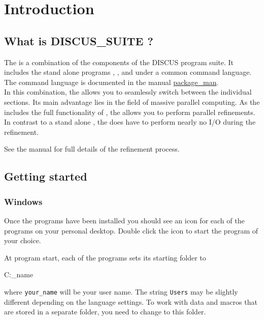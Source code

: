 
\chapter{Introduction \label{intro}}
\section{What is DISCUS\_SUITE ?}

The \Suite is a combination of the components of the DISCUS program 
suite. It includes the stand alone programs 
\href{./discus\_man.pdf}\discus, 
\href{./diffev\_man.pdf}\diffev, and
\href{./kuplot\_man.pdf}\Kuplot under a common  command language. 
The command language is documented in the manual 
\href{./package\_man.pdf}{package\_man}.\\
In this combination, the 
\Suite allows you to seamlessly switch between the individual
sections. Its main advantage lies in the field of massive parallel 
computing. As the \Suite includes the full functionality of 
\diffev, the \Suite allows you to perform parallel refinements.
In contrast to a stand alone \diffev, the \Suite does have to
perform nearly no I/O during the refinement.

See the \Diffev manual for full details of the refinement process.


\section{Getting started \label{intro-get}}

\subsection{Windows}

Once the programs have been installed you should see an icon for each of
the programs on your personal desktop. Double click the icon to start
the program of your choice.

At program start, each of the programs sets its starting folder to\\
\begin{MacVerbatim}
   C:\Users\your_name
\end{MacVerbatim}
where {\tt your\_name} will be your user name. The string {\tt Users}
may be slightly different depending on the language settings.
To work with data and macros that are stored in a separate folder,
you need to change to this folder.

